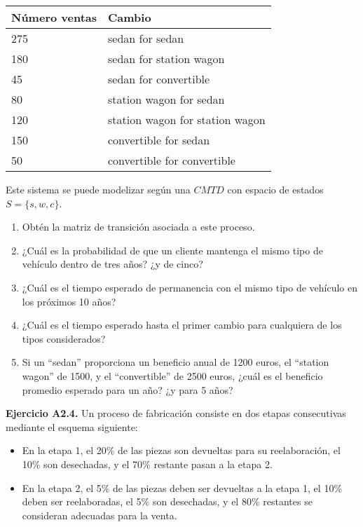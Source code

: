 \documentclass[
]{book}
\providecommand{\tightlist}{%
  \setlength{\itemsep}{0pt}\setlength{\parskip}{0pt}}
\theoremstyle{definition}
\theoremstyle{definition}
\theoremstyle{definition}
\theoremstyle{definition}
\theoremstyle{remark}
\begin{document}
\begin{longtable}[]{@{}ll@{}}
\toprule
Número ventas & Cambio \\
\midrule
\endhead
275 & sedan for sedan \\
180 & sedan for station wagon \\
45 & sedan for convertible \\
80 & station wagon for sedan \\
120 & station wagon for station wagon \\
150 & convertible for sedan \\
50 & convertible for convertible \\
\bottomrule
\end{longtable}

Este sistema se puede modelizar según una \(CMTD\) con espacio de estados \(S = \{s, w, c\}\).

\begin{enumerate}
\def\labelenumi{\arabic{enumi}.}
\tightlist
\item
  Obtén la matriz de transición asociada a este proceso.
\item
  ¿Cuál es la probabilidad de que un cliente mantenga el mismo tipo de vehículo dentro de tres años? ¿y de cinco?
\item
  ¿Cuál es el tiempo esperado de permanencia con el mismo tipo de vehículo en los próximos 10 años?
\item
  ¿Cuál es el tiempo esperado hasta el primer cambio para cualquiera de los tipos considerados?
\item
  Si un ``sedan'' proporciona un beneficio anual de 1200 euros, el ``station wagon'' de 1500, y el ``convertible'' de 2500 euros, ¿cuál es el beneficio promedio esperado para un año? ¿y para 5 años?
\end{enumerate}

\textbf{Ejercicio A2.4.} Un proceso de fabricación consiste en dos etapas consecutivas mediante el esquema siguiente:

\begin{itemize}
\tightlist
\item
  En la etapa 1, el 20\% de las piezas son devueltas para su reelaboración, el 10\% son desechadas, y el 70\% restante pasan a la etapa 2.
\item
  En la etapa 2, el 5\% de las piezas deben ser devueltas a la etapa 1, el 10\% deben ser reelaboradas, el 5\% son desechadas, y el 80\% restantes se consideran adecuadas para la venta.
\end{itemize}
\end{document}
